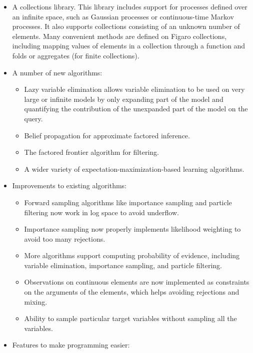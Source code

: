 \documentclass[]{article}
\begin{document}
\begin{itemize}
\item
  A collections library. This library includes support for processes
  defined over an infinite space, such as Gaussian processes or
  continuous-time Markov processes. It also supports collections
  consisting of an unknown number of elements. Many convenient methods
  are defined on Figaro collections, including mapping values of
  elements in a collection through a function and folds or aggregates
  (for finite collections).
\item
  A number of new algorithms:

  \begin{itemize}
  \item
    Lazy variable elimination allows variable elimination to be used on
    very large or infinite models by only expanding part of the model
    and quantifying the contribution of the unexpanded part of the model
    on the query.
  \item
    Belief propagation for approximate factored inference.
  \item
    The factored frontier algorithm for filtering.
  \item
    A wider variety of expectation-maximization-based learning
    algorithms.
  \end{itemize}
\item
  Improvements to existing algorithms:

  \begin{itemize}
  \item
    Forward sampling algorithms like importance sampling and particle
    filtering now work in log space to avoid underflow.
  \item
    Importance sampling now properly implements likelihood weighting to
    avoid too many rejections.
  \item
    More algorithms support computing probability of evidence, including
    variable elimination, importance sampling, and particle filtering.
  \item
    Observations on continuous elements are now implemented as
    constraints on the arguments of the elements, which helps avoiding
    rejections and mixing.
  \item
    Ability to sample particular target variables without sampling all
    the variables.
  \end{itemize}
\item
  Features to make programming easier:


\end{itemize}
\end{document}
